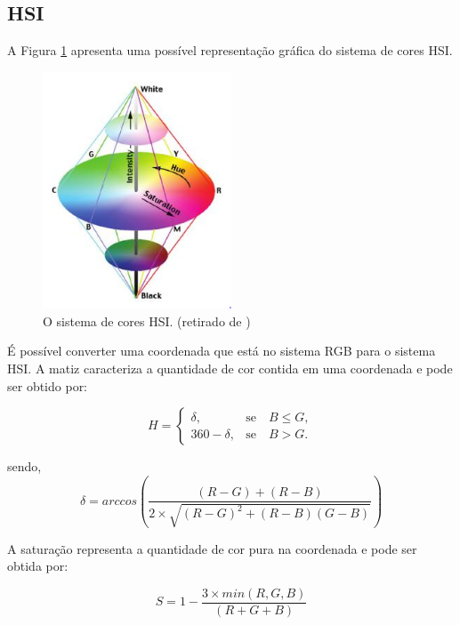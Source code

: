 \documentclass[	12pt, Times, openright, twoside, a4paper, english, brazil]{abntex2}
\begin{document}
\subsection{HSI}

A Figura \ref{fig:figuraHSI} apresenta uma possível representação gráfica do sistema de cores HSI.

\begin{figure}[!htb]
\centering \includegraphics[width=0.5\textwidth]{figuraHSI.png}
\caption{O sistema de cores HSI. (retirado de ) \label{fig:figuraHSI}}
\end{figure}

É possível converter uma coordenada que está no sistema RGB para o sistema HSI. A matiz caracteriza a quantidade de cor contida em uma coordenada e pode ser obtido por:

\begin{equation}
H=\left\{\begin{array}{rc}
\delta,&\mbox{se}\quad B\leq G,\\
360 - \delta, &\mbox{se}\quad B>G.
\end{array}\right.
\end{equation}

sendo,
\begin{equation}
\delta = arccos \left( \frac{(R - G) + (R - B)}{2  \times  \sqrt{(R-G)^2 + (R-B)(G-B)} } \right)
\end{equation}
 
A saturação representa a quantidade de cor pura na coordenada e pode ser obtida por: 

\begin{equation}
S = 1 -  \frac{3 \times min(R, G, B)}{(R+G+B)} 
\end{equation}
\end{document}
